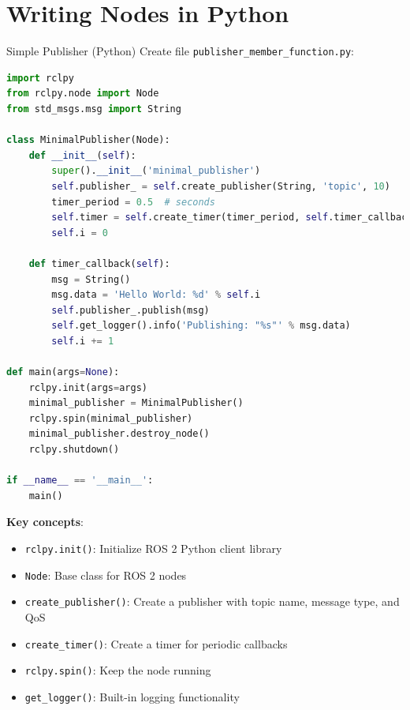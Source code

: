 \section{Writing Nodes in Python}

\begin{frame}{Simple Publisher (Python)}
    Create file \texttt{publisher\_member\_function.py}:

    \begin{lstlisting}[language=python]
import rclpy
from rclpy.node import Node
from std_msgs.msg import String

class MinimalPublisher(Node):
    def __init__(self):
        super().__init__('minimal_publisher')
        self.publisher_ = self.create_publisher(String, 'topic', 10)
        timer_period = 0.5  # seconds
        self.timer = self.create_timer(timer_period, self.timer_callback)
        self.i = 0

    def timer_callback(self):
        msg = String()
        msg.data = 'Hello World: %d' % self.i
        self.publisher_.publish(msg)
        self.get_logger().info('Publishing: "%s"' % msg.data)
        self.i += 1

def main(args=None):
    rclpy.init(args=args)
    minimal_publisher = MinimalPublisher()
    rclpy.spin(minimal_publisher)
    minimal_publisher.destroy_node()
    rclpy.shutdown()

if __name__ == '__main__':
    main()
\end{lstlisting}

    \framebreak

    \textbf{Key concepts}:
    \begin{itemize}
        \item \texttt{rclpy.init()}: Initialize ROS 2 Python client library
        \item \texttt{Node}: Base class for ROS 2 nodes
        \item \texttt{create\_publisher()}: Create a publisher with topic name, message type, and QoS
        \item \texttt{create\_timer()}: Create a timer for periodic callbacks
        \item \texttt{rclpy.spin()}: Keep the node running
        \item \texttt{get\_logger()}: Built-in logging functionality
    \end{itemize}
\end{frame}


